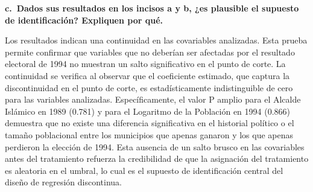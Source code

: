 \documentclass[
]{article}
\begin{document}
\newpage

\textbf{c.~Dados sus resultados en los incisos a y b, ¿es plausible el
supuesto de identificación? Expliquen por qué.}

Los resultados indican una continuidad en las covariables analizadas.
Esta prueba permite confirmar que variables que no deberían ser
afectadas por el resultado electoral de 1994 no muestran un salto
significativo en el punto de corte. La continuidad se verifica al
observar que el coeficiente estimado, que captura la discontinuidad en
el punto de corte, es estadísticamente indistinguible de cero para las
variables analizadas. Específicamente, el valor P amplio para el Alcalde
Islámico en 1989 (0.781) y para el Logaritmo de la Población en 1994
(0.866) demuestra que no existe una diferencia significativa en el
historial político o el tamaño poblacional entre los municipios que
apenas ganaron y los que apenas perdieron la elección de 1994. Esta
ausencia de un salto brusco en las covariables antes del tratamiento
refuerza la credibilidad de que la asignación del tratamiento es
aleatoria en el umbral, lo cual es el supuesto de identificación central
del diseño de regresión discontinua.
\end{document}
